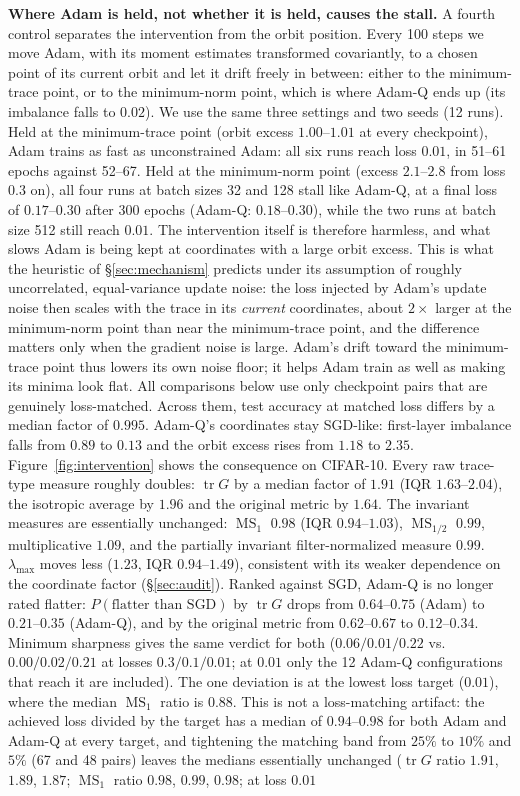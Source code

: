 \documentclass[10pt]{article}
\theoremstyle{remark}
\newcommand{\tr}{\operatorname{tr}}
\newcommand{\MS}{\operatorname{MS}}
\begin{document}
\textbf{Where Adam is held, not whether it is held, causes the stall.} A fourth control separates the intervention from the orbit position. Every 100 steps we move Adam, with its moment estimates transformed covariantly, to a chosen point of its current orbit and let it drift freely in between: either to the minimum-trace point, or to the minimum-norm point, which is where Adam-Q ends up (its imbalance falls to $0.02$). We use the same three settings and two seeds (12 runs). Held at the minimum-trace point (orbit excess $1.00$--$1.01$ at every checkpoint), Adam trains as fast as unconstrained Adam: all six runs reach loss $0.01$, in 51--61 epochs against 52--67. Held at the minimum-norm point (excess $2.1$--$2.8$ from loss $0.3$ on), all four runs at batch sizes 32 and 128 stall like Adam-Q, at a final loss of $0.17$--$0.30$ after 300 epochs (Adam-Q: $0.18$--$0.30$), while the two runs at batch size 512 still reach $0.01$. The intervention itself is therefore harmless, and what slows Adam is being kept at coordinates with a large orbit excess. This is what the heuristic of \S\ref{sec:mechanism} predicts under its assumption of roughly uncorrelated, equal-variance update noise: the loss injected by Adam's update noise then scales with the trace in its \emph{current} coordinates, about $2\times$ larger at the minimum-norm point than near the minimum-trace point, and the difference matters only when the gradient noise is large. Adam's drift toward the minimum-trace point thus lowers its own noise floor; it helps Adam train as well as making its minima look flat. All comparisons below use only checkpoint pairs that are genuinely loss-matched. Across them, test accuracy at matched loss differs by a median factor of $0.995$. Adam-Q's coordinates stay SGD-like: first-layer imbalance falls from $0.89$ to $0.13$ and the orbit excess rises from $1.18$ to $2.35$. Figure~\ref{fig:intervention} shows the consequence on CIFAR-10. Every raw trace-type measure roughly doubles: $\tr G$ by a median factor of $1.91$ (IQR $1.63$--$2.04$), the isotropic average by $1.96$ and the original metric by $1.64$. The invariant measures are essentially unchanged: $\MS_1$ $0.98$ (IQR $0.94$--$1.03$), $\MS_{1/2}$ $0.99$, multiplicative $1.09$, and the partially invariant filter-normalized measure $0.99$. $\lambda_{\max}$ moves less ($1.23$, IQR $0.94$--$1.49$), consistent with its weaker dependence on the coordinate factor (\S\ref{sec:audit}). Ranked against SGD, Adam-Q is no longer rated flatter: $P(\text{flatter than SGD})$ by $\tr G$ drops from $0.64$--$0.75$ (Adam) to $0.21$--$0.35$ (Adam-Q), and by the original metric from $0.62$--$0.67$ to $0.12$--$0.34$. Minimum sharpness gives the same verdict for both ($0.06/0.01/0.22$ vs.\ $0.00/0.02/0.21$ at losses $0.3/0.1/0.01$; at $0.01$ only the 12 Adam-Q configurations that reach it are included). The one deviation is at the lowest loss target ($0.01$), where the median $\MS_1$ ratio is $0.88$. This is not a loss-matching artifact: the achieved loss divided by the target has a median of $0.94$--$0.98$ for both Adam and Adam-Q at every target, and tightening the matching band from $25\%$ to $10\%$ and $5\%$ (67 and 48 pairs) leaves the medians essentially unchanged ($\tr G$ ratio $1.91$, $1.89$, $1.87$; $\MS_1$ ratio $0.98$, $0.99$, $0.98$; at loss $0.01$ 
\end{document}
